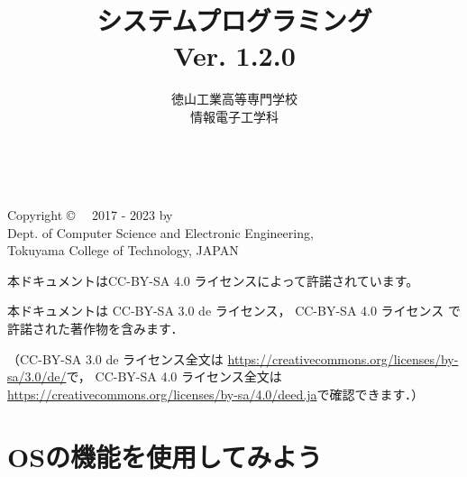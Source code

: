 \documentclass[a4paper,11pt,twocolumn]{ltjsbook}      %
\begin{document}
\frontmatter
\title{システムプログラミング\\Ver. 1.2.0}
\author{徳山工業高等専門学校\\情報電子工学科}
\date{}
\maketitle

\thispagestyle{empty}
\onecolumn
~
\vfill
\begin{flushleft}
Copyright \copyright ~~ 2017 - 2023 by \\
Dept. of Computer Science and Electronic Engineering, \\
Tokuyama College of Technology, JAPAN
\end{flushleft}

\vspace{0.8cm}
本ドキュメントはCC-BY-SA 4.0 ライセンスによって許諾されています。

本ドキュメントは
CC-BY-SA 3.0 de ライセンス，
CC-BY-SA 4.0 ライセンス
で許諾された著作物を含みます．

（CC-BY-SA 3.0 de ライセンス全文は
\url{https://creativecommons.org/licenses/by-sa/3.0/de/}で，
CC-BY-SA 4.0 ライセンス全文は
\url{https://creativecommons.org/licenses/by-sa/4.0/deed.ja}で確認できます．）

\setcounter{tocdepth}{2}
\tableofcontents

\mainmatter

\part{OSの機能を使用してみよう}
\setcounter{page}{23}               %
\end{document}
